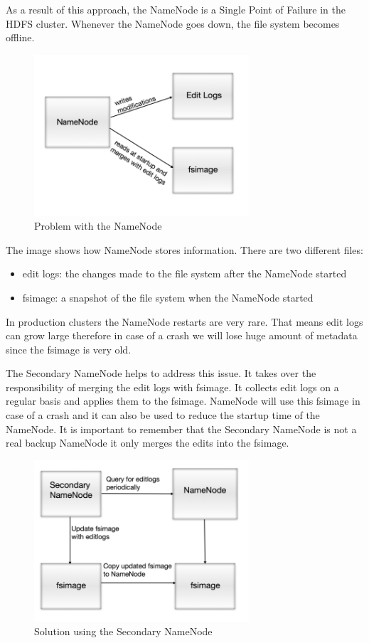 As a result of this approach, the NameNode is a Single Point of Failure in the HDFS cluster. Whenever the NameNode goes down, the file system becomes offline.
\begin{figure}[H]
	\includegraphics[width=80mm, keepaspectratio]{figures/namenode_problem.png}
	\centering
	\caption*{Problem with the NameNode}
\end{figure}
The image shows how NameNode stores information. There are two different files:
\begin{itemize}
	\item edit logs: the changes made to the file system after the NameNode started
	\item fsimage: a snapshot of the file system when the NameNode started
\end{itemize}
In production clusters the NameNode restarts are very rare. That means edit logs can grow large therefore in case of a crash we will lose huge amount of metadata since the fsimage is very old.

The Secondary NameNode helps to address this issue. It takes over the responsibility of merging the edit logs with fsimage. It collects edit logs on a regular basis and applies them to the fsimage. NameNode will use this fsimage in case of a crash and it can also be used to reduce the startup time of the NameNode.
It is important to remember that the Secondary NameNode is not a real backup NameNode it only merges the edits into the fsimage. 

\begin{figure}[H]
	\includegraphics[width=80mm, keepaspectratio]{figures/secondary_namenode.png}
	\centering
	\caption*{Solution using the Secondary NameNode}
\end{figure}

